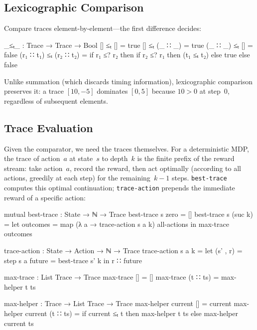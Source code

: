 \documentclass[9pt,a4paper]{article}
\theoremstyle{plain}
\theoremstyle{definition}
\theoremstyle{remark}
\begin{document}
\subsection{Lexicographic Comparison}

Compare traces element-by-element---the first difference decides:

\begin{code}
  _≤ₜ_ : Trace → Trace → Bool
  []       ≤ₜ []       = true
  []       ≤ₜ (_ ∷ _)  = true
  (_ ∷ _)  ≤ₜ []       = false
  (r₁ ∷ t₁) ≤ₜ (r₂ ∷ t₂) =
    if r₁ ≤? r₂ then
      if r₂ ≤? r₁ then (t₁ ≤ₜ t₂)
      else true
    else false
\end{code}

\noindent Unlike summation (which discards timing information), lexicographic comparison preserves it: a trace $[10, -5]$ dominates $[0, 5]$ because $10 > 0$ at step~$0$, regardless of subsequent elements.

\subsection{Trace Evaluation}

Given the comparator, we need the traces themselves.  For a deterministic MDP, the trace of action~$a$ at state~$s$ to depth~$k$ is the finite prefix of the reward stream: take action~$a$, record the reward, then act optimally (according to all actions, greedily at each step) for the remaining~$k{-}1$ steps.  \texttt{best-trace} computes this optimal continuation; \texttt{trace-action} prepends the immediate reward of a specific action:

\begin{code}
  mutual
    best-trace : State → ℕ → Trace
    best-trace s zero    = []
    best-trace s (suc k) =
      let outcomes = map (λ a → trace-action s a k) all-actions
      in max-trace outcomes

    trace-action : State → Action → ℕ → Trace
    trace-action s a k =
      let (s' , r) = step s a
          future   = best-trace s' k
      in r ∷ future

    max-trace : List Trace → Trace
    max-trace []       = []
    max-trace (t ∷ ts) = max-helper t ts

    max-helper : Trace → List Trace → Trace
    max-helper current [] = current
    max-helper current (t ∷ ts) =
      if current ≤ₜ t
      then max-helper t ts
      else max-helper current ts
\end{code}
\end{document}
